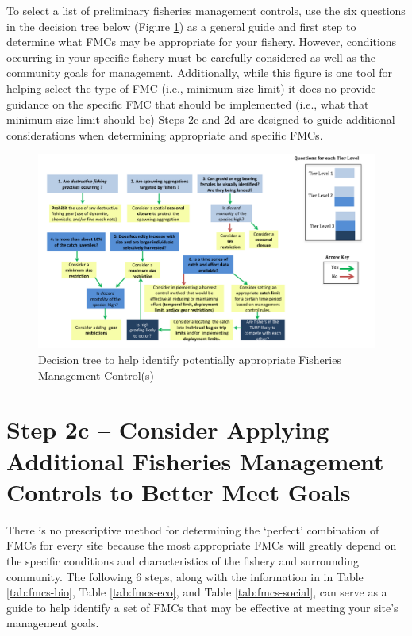 \documentclass[]{book}
\begin{document}
To select a list of preliminary fisheries management controls, use the
six questions in the decision tree below (Figure
\ref{fig:decision-tree}) as a general guide and first step to determine
what FMCs may be appropriate for your fishery. However, conditions
occurring in your specific fishery must be carefully considered as well
as the community goals for management. Additionally, while this figure
is one tool for helping select the type of FMC (i.e., minimum size
limit) it does no provide guidance on the specific FMC that should be
implemented (i.e., what that minimum size limit should be)
\protect\hyperlink{Step2c}{Steps 2c} and \protect\hyperlink{Step2d}{2d}
are designed to guide additional considerations when determining
appropriate and specific FMCs.

\begin{figure}
\centering
\includegraphics{myMediaFolder/media/FMCs.png}
\caption{\label{fig:decision-tree}Decision tree to help identify potentially
appropriate Fisheries Management Control(s)}
\end{figure}

\hypertarget{Step2c}{\section{Step 2c -- Consider Applying Additional
Fisheries Management Controls to Better Meet Goals}\label{Step2c}}

There is no prescriptive method for determining the `perfect'
combination of FMCs for every site because the most appropriate FMCs
will greatly depend on the specific conditions and characteristics of
the fishery and surrounding community. The following 6 steps, along with
the information in in Table \ref{tab:fmcs-bio}, Table
\ref{tab:fmcs-eco}, and Table \ref{tab:fmcs-social}, can serve as a
guide to help identify a set of FMCs that may be effective at meeting
your site's management goals.
\end{document}
